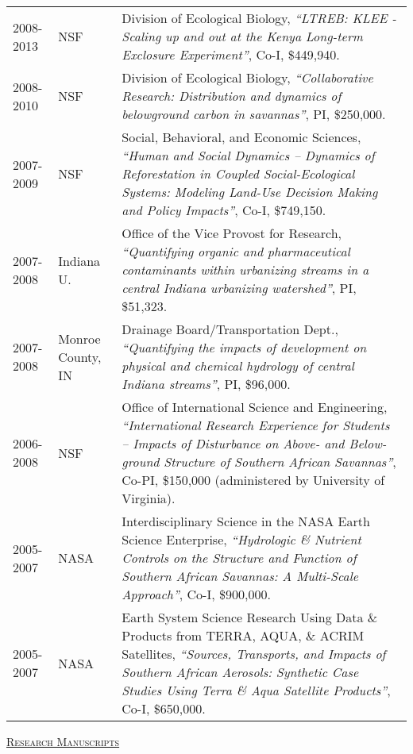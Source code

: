 \documentclass[10pt]{report}
\begin{document}
\begin{longtable}{ l p{.8in} p{5in}  }
2008-2013 & NSF & Division of Ecological Biology, \emph{``LTREB: KLEE - Scaling up and out at the Kenya Long-term Exclosure Experiment''}, Co-I, \$449,940. \\ 

2008-2010 & NSF & Division of Ecological Biology, \emph{``Collaborative Research: Distribution and dynamics of belowground carbon in savannas''}, PI, \$250,000. \\ 

2007-2009 & NSF  & Social, Behavioral, and Economic Sciences, \emph{``Human and Social Dynamics -- Dynamics of Reforestation in Coupled Social-Ecological Systems: Modeling Land-Use Decision Making and Policy Impacts''}, Co-I, \$749,150. \\

2007-2008 & Indiana U.  & Office of the Vice Provost for Research, \emph{``Quantifying organic and pharmaceutical contaminants within urbanizing streams in a central Indiana urbanizing watershed''}, PI, \$51,323. \\

2007-2008  & Monroe County, IN & Drainage Board/Transportation Dept., \emph{``Quantifying the impacts of development on physical and chemical hydrology of central Indiana streams''}, PI, \$96,000. \\

2006-2008 & NSF &  Office of International Science and Engineering, \emph{``International Research Experience for Students -- Impacts of Disturbance on Above- and Below-ground Structure of Southern African Savannas''}, Co-PI, \$150,000 (administered by University of Virginia). \\

2005-2007 &  NASA & Interdisciplinary Science in the NASA Earth Science Enterprise,\emph{ ``Hydrologic \& Nutrient Controls on the Structure and Function of Southern African Savannas: A Multi-Scale Approach''}, Co-I, \$900,000. \\ 

2005-2007 & NASA &  Earth System Science Research Using Data \& Products from TERRA, AQUA, \& ACRIM Satellites, \emph{``Sources, Transports, and Impacts of Southern African Aerosols: Synthetic Case Studies Using Terra \& Aqua Satellite Products''}, Co-I, \$650,000. \\

\end{longtable}

\vspace*{.1in}
\textsc{\underline{Research Manuscripts}}
\end{document}

